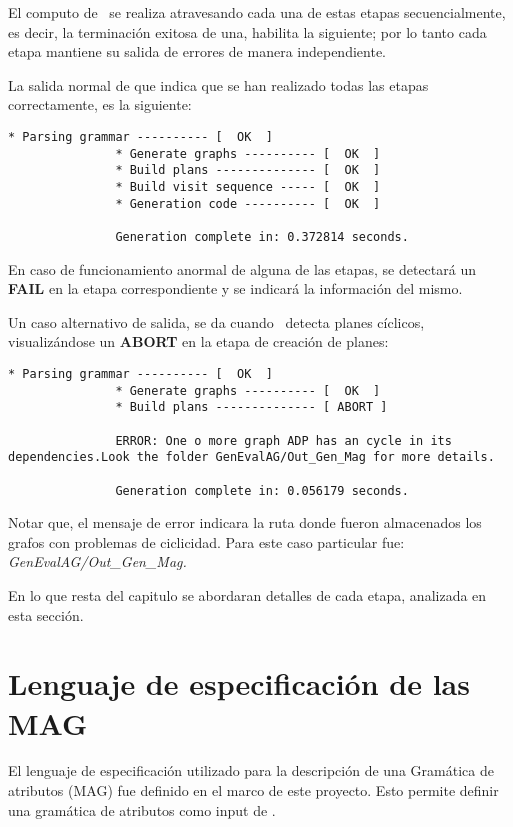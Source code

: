 El computo de \maggen\ se realiza atravesando cada una de estas etapas secuencialmente, es decir, la terminación exitosa de una, habilita la siguiente; por lo tanto cada etapa mantiene su salida de errores de manera independiente. 

La salida normal de \maggen que indica que se han realizado todas las etapas correctamente, es la siguiente:

\begin{lstlisting}[backgroundcolor=\color{white}]
               * Parsing grammar ---------- [  OK  ]
               * Generate graphs ---------- [  OK  ]
               * Build plans -------------- [  OK  ]
               * Build visit sequence ----- [  OK  ]
               * Generation code ---------- [  OK  ]

               Generation complete in: 0.372814 seconds.
\end{lstlisting}

En caso de funcionamiento anormal de alguna de las etapas, se detectará un \textbf{FAIL} en la etapa correspondiente y se indicará la información del mismo.

Un caso alternativo de salida, se da cuando \maggen\ detecta planes cíclicos, visualizándose un \textbf{ABORT} en la etapa de creación de planes:

\begin{lstlisting}[backgroundcolor=\color{white}] 
               * Parsing grammar ---------- [  OK  ]
               * Generate graphs ---------- [  OK  ]
               * Build plans -------------- [ ABORT ]

               ERROR: One o more graph ADP has an cycle in its dependencies.Look the folder GenEvalAG/Out_Gen_Mag for more details.

               Generation complete in: 0.056179 seconds.
\end{lstlisting}
Notar que, el mensaje de error indicara la ruta donde fueron almacenados los grafos con problemas de ciclicidad. Para este caso particular fue: \textit{GenEvalAG/Out\_Gen\_Mag.}

En lo que resta del capitulo se abordaran detalles de cada etapa, analizada en esta sección.

\section{Lenguaje de especificación de las MAG}

El lenguaje de especificación utilizado para la descripción de una Gramática de atributos (MAG) fue definido en el marco de este proyecto. Esto permite definir una gramática de atributos como input de \maggen.
 
